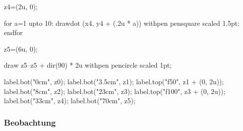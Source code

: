 z4=(2u, 0);

for a=1 upto 10:
drawdot (x4, y4 + (.2u * a)) withpen pensquare scaled 1.5pt;
endfor

z5=(6u, 0);

draw z5--z5 + dir(90) * 2u withpen pencircle scaled 1pt;


label.bot("0cm", z0);
label.bot("3.5cm", z1);
label.top("f50", z1 + (0, 2u));
label.bot("8cm", z2);
label.bot("23cm", z3);
label.top("f100", z3 + (0, 2u));
label.bot("33cm", z4);
label.bot("70cm", z5);

\stopMPpage
\stopbuffer


\subsubsection{Beobachtung}


\stopsubsection
